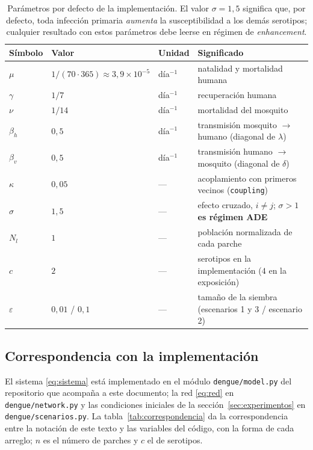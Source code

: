\documentclass{article}
\numberwithin{equation}{section}
\begin{document}
\begin{table}[h]
\centering
\begin{tabular}{llll}
\hline
Símbolo & Valor & Unidad & Significado \\
\hline
$\mu$ & $1/(70\cdot 365)\approx 3{,}9\times10^{-5}$ & día$^{-1}$ & natalidad y mortalidad humana \\
$\gamma$ & $1/7$ & día$^{-1}$ & recuperación humana \\
$\nu$ & $1/14$ & día$^{-1}$ & mortalidad del mosquito \\
$\beta_h$ & $0{,}5$ & día$^{-1}$ & transmisión mosquito $\to$ humano (diagonal de $\lambda$) \\
$\beta_v$ & $0{,}5$ & día$^{-1}$ & transmisión humano $\to$ mosquito (diagonal de $\delta$) \\
$\kappa$ & $0{,}05$ & --- & acoplamiento con primeros vecinos (\texttt{coupling}) \\
$\sigma$ & $1{,}5$ & --- & efecto cruzado, $i\neq j$; \textbf{$\sigma>1$ es régimen ADE} \\
$N_l$ & $1$ & --- & población normalizada de cada parche \\
$c$ & $2$ & --- & serotipos en la implementación ($4$ en la exposición) \\
$\varepsilon$ & $0{,}01$ / $0{,}1$ & --- & tamaño de la siembra (escenarios 1 y 3 / escenario 2) \\
\hline
\end{tabular}
\caption{Parámetros por defecto de la implementación. El valor $\sigma=1{,}5$ significa que, por defecto, toda infección primaria \emph{aumenta} la susceptibilidad a los demás serotipos; cualquier resultado con estos parámetros debe leerse en régimen de \emph{enhancement}.}
\label{tab:parametros}
\end{table}

\subsection{Correspondencia con la implementación}\label{sec:codigo}

El sistema \eqref{eq:sistema} está implementado en el módulo \texttt{dengue/model.py} del repositorio que acompaña a este documento; la red \eqref{eq:red} en \texttt{dengue/network.py} y las condiciones iniciales de la sección~\ref{sec:experimentos} en \texttt{dengue/scenarios.py}. La tabla~\ref{tab:correspondencia} da la correspondencia entre la notación de este texto y las variables del código, con la forma de cada arreglo; $n$ es el número de parches y $c$ el de serotipos.
\end{document}
